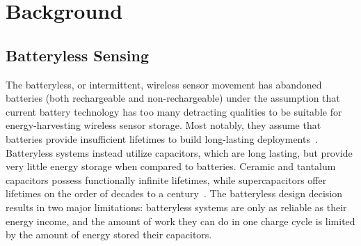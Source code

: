 \chapter{Background}


\section{Batteryless Sensing}

The batteryless, or intermittent, wireless sensor movement has abandoned batteries (both rechargeable and non-rechargeable) under the assumption that current battery technology has too many detracting qualities to be suitable for energy-harvesting wireless sensor storage.
Most notably, they assume that batteries provide insufficient lifetimes to build long-lasting deployments~\cite{hesterNew17, hesterTragedy15, hesterFlicker17, hesterTimely17, hester2017future, colinReconfigurable18, luciaIntermittent17, yervaGrafting12, majid2020continuous}.
Batteryless systems instead utilize capacitors, which are long lasting, but provide very little energy storage when compared to batteries. Ceramic and tantalum capacitors possess functionally infinite lifetimes, while supercapacitors offer lifetimes on the order of decades to a century~\cite{kemetLife}.
The batteryless design decision results in two major limitations: batteryless systems are only as reliable as their energy income, and the amount of work they can do in one charge cycle is limited by the amount of energy stored their capacitors.


